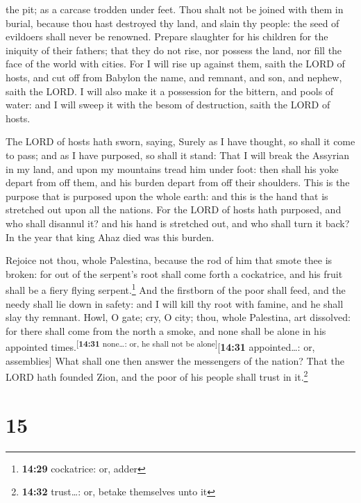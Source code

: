 the pit; as a carcase trodden under feet.  Thou shalt not
be joined with them in burial, because thou hast destroyed thy land, and
slain thy people: the seed of evildoers shall never be renowned.
 Prepare slaughter for his children for the iniquity of
their fathers; that they do not rise, nor possess the land, nor fill the
face of the world with cities.  For I will rise up
against them, saith the LORD of hosts, and cut off from Babylon the
name, and remnant, and son, and nephew, saith the LORD. 
I will also make it a possession for the bittern, and pools of water:
and I will sweep it with the besom of destruction, saith the LORD of
hosts.

 The LORD of hosts hath sworn, saying, Surely as I have
thought, so shall it come to pass; and as I have purposed, so shall it
stand:  That I will break the Assyrian in my land, and
upon my mountains tread him under foot: then shall his yoke depart from
off them, and his burden depart from off their shoulders.
 This is the purpose that is purposed upon the whole
earth: and this is the hand that is stretched out upon all the nations.
 For the LORD of hosts hath purposed, and who shall
disannul it? and his hand is stretched out, and who shall turn it back?
 In the year that king Ahaz died was this burden.

 Rejoice not thou, whole Palestina, because the rod of
him that smote thee is broken: for out of the serpent's root shall come
forth a cockatrice, and his fruit shall be a fiery flying
serpent.\footnote{\textbf{14:29} cockatrice: or, adder} 
And the firstborn of the poor shall feed, and the needy shall lie down
in safety: and I will kill thy root with famine, and he shall slay thy
remnant.  Howl, O gate; cry, O city; thou, whole
Palestina, art dissolved: for there shall come from the north a smoke,
and none shall be alone in his appointed
times.\textsuperscript{{[}\textbf{14:31} none\ldots: or, he shall not be
alone{]}}{[}\textbf{14:31} appointed\ldots: or, assemblies{]}
 What shall one then answer the messengers of the nation?
That the LORD hath founded Zion, and the poor of his people shall trust
in it.\footnote{\textbf{14:32} trust\ldots: or, betake themselves unto
  it}

\hypertarget{section-14}{%
\section{15}\label{section-14}}

